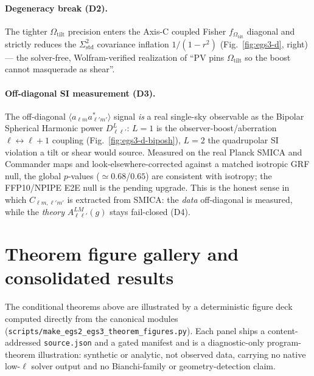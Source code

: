 \documentclass[11pt,a4paper]{article}
\newcommand{\Sigstd}{\Sigma^{2}_{\mathrm{std}}}
\newcommand{\Otilt}{\Omega_{\mathrm{tilt}}}
\theoremstyle{plain}
\theoremstyle{definition}
\begin{document}
\paragraph{Degeneracy break (D2).}
The tighter $\Otilt$ precision enters the Axis-C coupled Fisher $f_{\Otilt}$ diagonal and
strictly reduces the $\Sigstd$ covariance inflation $1/(1-r^2)$
(Fig.~\ref{fig:egs3-d}, right) --- the solver-free, Wolfram-verified realization of ``PV
pins $\Otilt$ so the boost cannot masquerade as shear''.

\paragraph{Off-diagonal SI measurement (D3).}
The off-diagonal $\langle a_{\ell m}a^{*}_{\ell'm'}\rangle$ signal \emph{is} a real single-sky
observable as the Bipolar Spherical Harmonic power $D^{L}_{\ell\ell'}$: $L{=}1$ is the
observer-boost/aberration $\ell\!\leftrightarrow\!\ell{+}1$ coupling
(Fig.~\ref{fig:egs3-d-biposh}), $L{=}2$ the quadrupolar SI violation a tilt or shear would
source. Measured on the real Planck SMICA and Commander maps and look-elsewhere-corrected
against a matched isotropic GRF null, the global $p$-values ($\simeq0.68$/$0.65$) are
consistent with isotropy; the FFP10/NPIPE E2E null is the pending upgrade. This is the honest
sense in which $C_{\ell m,\ell'm'}$ is extracted from SMICA: the \emph{data} off-diagonal is
measured, while the \emph{theory} $A^{LM}_{\ell\ell'}(g)$ stays fail-closed (D4).

\section{Theorem figure gallery and consolidated results}
\label{sec:gallery}

The conditional theorems above are illustrated by a deterministic figure deck
computed directly from the canonical modules
(\texttt{scripts/make\_egs2\_egs3\_theorem\_figures.py}). Each panel ships a
content-addressed \texttt{source.json} and a gated manifest and is a
diagnostic-only program-theorem illustration: synthetic or analytic, not
observed data, carrying no native low-$\ell$ solver output and no Bianchi-family
or geometry-detection claim.
\end{document}
